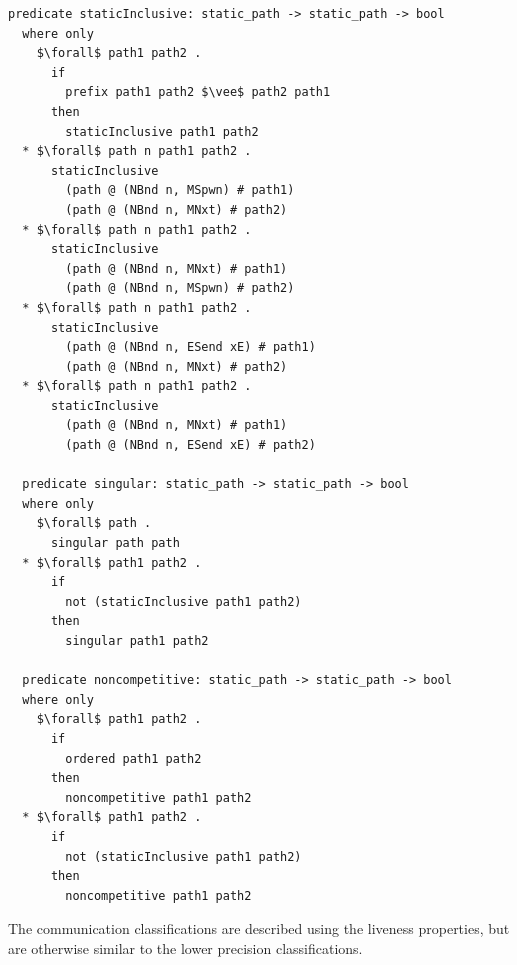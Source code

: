 \documentclass[letterpaper, 11pt]{extarticle}
\begin{document}
\begin{lstlisting}[language=logic, mathescape]
  predicate staticInclusive: static_path -> static_path -> bool
  where only
    $\forall$ path1 path2 .
      if
        prefix path1 path2 $\vee$ path2 path1
      then
        staticInclusive path1 path2
  * $\forall$ path n path1 path2 .
      staticInclusive
        (path @ (NBnd n, MSpwn) # path1)
        (path @ (NBnd n, MNxt) # path2)
  * $\forall$ path n path1 path2 .
      staticInclusive
        (path @ (NBnd n, MNxt) # path1)
        (path @ (NBnd n, MSpwn) # path2)
  * $\forall$ path n path1 path2 .
      staticInclusive
        (path @ (NBnd n, ESend xE) # path1)
        (path @ (NBnd n, MNxt) # path2)
  * $\forall$ path n path1 path2 .
      staticInclusive
        (path @ (NBnd n, MNxt) # path1)
        (path @ (NBnd n, ESend xE) # path2)

  predicate singular: static_path -> static_path -> bool
  where only
    $\forall$ path .
      singular path path
  * $\forall$ path1 path2 .
      if
        not (staticInclusive path1 path2)
      then
        singular path1 path2

  predicate noncompetitive: static_path -> static_path -> bool
  where only
    $\forall$ path1 path2 . 
      if
        ordered path1 path2
      then
        noncompetitive path1 path2
  * $\forall$ path1 path2 .
      if
        not (staticInclusive path1 path2)
      then
        noncompetitive path1 path2
  \end{lstlisting}

The communication classifications are described using the liveness properties, but
are otherwise similar to the lower precision classifications.
\end{document}
